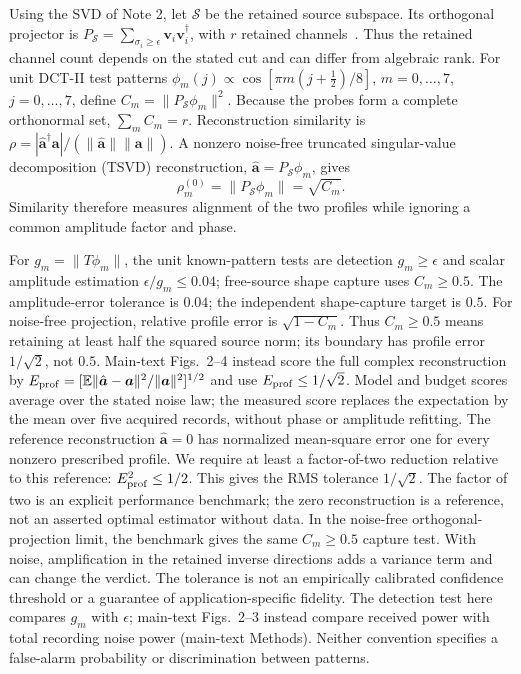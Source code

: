 \documentclass[pdflatex,sn-nature]{sn-jnl}%
\begin{document}
Using the SVD of Note 2, let $\mathcal S$ be the retained source subspace. Its orthogonal projector is
$P_{\mathcal S}=\sum_{\sigma_i\ge\epsilon}\bm v_i\bm v_i^\dagger$, with
$r$ retained channels~\cite{miller2019}.
Thus the retained channel count depends on the stated cut and can differ from algebraic rank.
For unit DCT-II test patterns
$\phi_m(j)\propto\cos[\pi m(j+\tfrac12)/8]$, $m=0,\ldots,7$,
$j=0,\ldots,7$, define $C_m=\|P_{\mathcal S}\phi_m\|^2$.
Because the probes form a complete orthonormal set, $\sum_m C_m=r$.
Reconstruction similarity is
$\rho=|\hat{\bm a}^{\dagger}\bm a|/(\|\hat{\bm a}\|\|\bm a\|)$.
A nonzero noise-free truncated singular-value decomposition (TSVD) reconstruction,
$\hat{\bm a}=P_{\mathcal S}\phi_m$, gives
\begin{equation}
 \rho_m^{(0)}=\|P_{\mathcal S}\phi_m\|=\sqrt{C_m}.
 \label{eq:rhoeqC}
\end{equation}
Similarity therefore measures alignment of the two profiles while ignoring a common amplitude factor and phase.

For $g_m=\|T\phi_m\|$, the unit known-pattern tests are detection
$g_m\ge\epsilon$ and scalar amplitude estimation $\epsilon/g_m\le0.04$;
free-source shape capture uses $C_m\ge0.5$.
The amplitude-error tolerance is $0.04$; the independent shape-capture target is $0.5$.
For noise-free projection, relative profile error is $\sqrt{1-C_m}$.
Thus $C_m\ge0.5$ means retaining at least half the squared source norm;
its boundary has profile error $1/\sqrt2$, not $0.5$.
Main-text Figs.~2--4 instead score the full complex reconstruction by
$E_{\rm prof}=[\mathbb E\|\hat{\bm a}-\bm a\|^2/\|\bm a\|^2]^{1/2}$
and use $E_{\rm prof}\le1/\sqrt2$. Model and budget scores average over
the stated noise law; the measured score replaces the expectation by the
mean over five acquired records, without phase or amplitude refitting.
The reference reconstruction $\hat{\bm a}=0$ has normalized mean-square error one for every nonzero prescribed profile. We require at least a factor-of-two reduction relative to this reference: $E_{\rm prof}^2\le1/2$. This gives the RMS tolerance $1/\sqrt2$. The factor of two is an explicit performance benchmark; the zero reconstruction is a reference, not an asserted optimal estimator without data. In the noise-free orthogonal-projection limit, the benchmark gives the same $C_m\ge0.5$ capture test. With noise, amplification in the retained inverse directions adds a variance term and can change the verdict. The tolerance is not an empirically calibrated confidence threshold or a guarantee of application-specific fidelity.
The detection test here compares $g_m$ with $\epsilon$; main-text Figs.~2--3
instead compare received power with total recording noise power (main-text Methods).
Neither convention specifies a false-alarm probability or discrimination between patterns.
\end{document}
